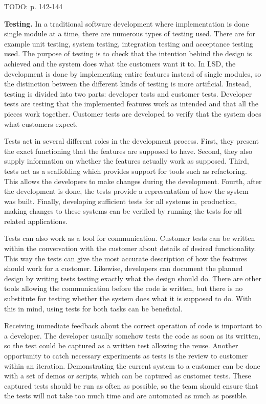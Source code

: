 TODO: p. 142-144

\textbf{Testing.} In a traditional software development where implementation is done single module at a time, there are numerous types of testing used. There are for example unit testing, system testing, integration testing and acceptance testing used. The purpose of testing is to check that the intention behind the design is achieved and the system does what the customers want it to. In LSD, the development is done by implementing entire features instead of single modules, so the distinction between the different kinds of testing is more artificial. Instead, testing is divided into two parts: developer tests and customer tests. Developer tests are testing that the implemented features work as intended and that all the pieces work together. Customer tests are developed to verify that the system does what customers expect.

Tests act in several different roles in the development process. First, they present the exact functioning that the features are supposed to have. Second, they also supply information on whether the features actually work as supposed. Third, tests act as a scaffolding which provides support for tools such as refactoring. This allows the developers to make changes during the development. Fourth, after the development is done, the tests provide a representation of how the system was built. Finally, developing sufficient tests for all systems in production, making changes to these systems can be verified by running the tests for all related applications.

Tests can also work as a tool for communication. Customer tests can be written within the conversation with the customer about details of desired functionality. This way the tests can give the most accurate description of how the features should work for a customer. Likewise, developers can document the planned design by writing tests testing exactly what the design should do. There are other tools allowing the communication before the code is written, but there is no substitute for testing whether the system does what it is supposed to do. With this in mind, using tests for both tasks can be beneficial.

Receiving immediate feedback about the correct operation of code is important to a developer. The developer usually somehow tests the code as soon as its written, so the test could be captured as a written test allowing the reuse. Another opportunity to catch necessary experiments as tests is the review to customer within an iteration. Demonstrating the current system to a customer can be done with a set of demos or scripts, which can be captured as customer tests. These captured tests should be run as often as possible, so the team should ensure that the tests will not take too much time and are automated as much as possible.


